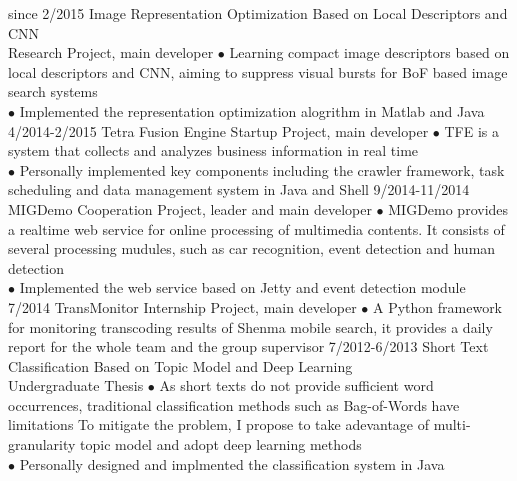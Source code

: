 \documentclass[]{friggeri-cv}
\begin{document}
\begin{entrylist}
  \entry
    {since 2/2015}
    {Image Representation Optimization Based on Local Descriptors and CNN \\ }
    {Research Project, main developer}
    {$\bullet$ Learning compact image descriptors based on local descriptors and CNN, aiming to suppress visual bursts for BoF based image search systems \\
    $\bullet$ Implemented the representation optimization alogrithm in Matlab and Java}
  \entry
    {4/2014-2/2015}
    {Tetra Fusion Engine}
    {Startup Project, main developer}
    {$\bullet$ TFE is a system that collects and analyzes business information in real time \\
    $\bullet$ Personally implemented key components including the crawler framework, task scheduling and data management system in Java and Shell}
  \entry
    {9/2014-11/2014}
    {MIGDemo}
    {Cooperation Project, leader and main developer}
    {$\bullet$ MIGDemo provides a realtime web service for online processing of multimedia contents. It consists of several processing mudules, such as car recognition, event detection and human detection\\
    $\bullet$ Implemented the web service based on Jetty and event detection module}
  \entry
    {7/2014}
    {TransMonitor}
    {Internship Project, main developer}
    {$\bullet$ A Python framework for monitoring transcoding results of Shenma mobile search, it provides a daily report for the whole team and the group supervisor }
  \entry
    {7/2012-6/2013}
    {Short Text Classification Based on Topic Model and Deep Learning \\ }
    {Undergraduate Thesis}
    {$\bullet$ As short texts do not provide sufficient word occurrences, traditional classification methods such as Bag-of-Words have limitations
    To mitigate the problem, I propose to take adevantage of multi-granularity topic model and adopt deep learning methods \\
    $\bullet$ Personally designed and implmented the classification system in Java}
\end{entrylist}
\end{document}
